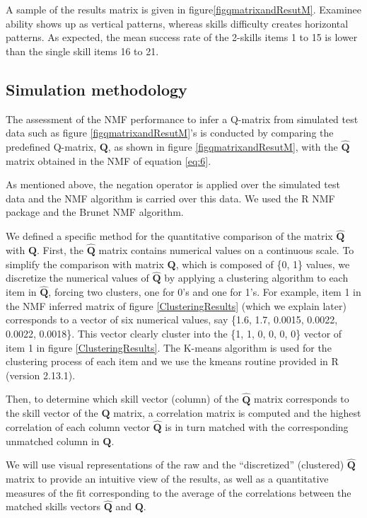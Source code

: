 A sample of the results matrix is given in figure\ref{figqmatrixandResutM}. Examinee ability shows up as vertical patterns, whereas skills difficulty creates horizontal patterns. As expected, the mean success rate of the 2-skills items 1 to 15 is lower than the single skill items 16 to 21.



\subsection{Simulation methodology}


The assessment of the NMF performance to infer a Q-matrix from simulated test data such as figure \ref{figqmatrixandResutM}'s is conducted by comparing the predefined Q-matrix, $\mathbf{Q}$, as shown in figure \ref{figqmatrixandResutM}, with the $\hat{\mathbf{Q}}$ matrix obtained in the NMF of equation \ref{eq:6}.

As mentioned above, the negation operator is applied over the simulated test data and the NMF algorithm is carried over this data. We used the R NMF package \citep{Gaujoux2010} and the Brunet NMF algorithm.

We defined a specific method for the quantitative comparison of the matrix $\hat{\mathbf{Q}}$ with $\mathbf{Q}$. First, the $\hat{\mathbf{Q}}$ matrix contains numerical values on a continuous scale. To simplify the comparison with matrix $\mathbf{Q}$, which is composed of \{0, 1\} values, we discretize the numerical values of $\hat{\mathbf{Q}}$ by applying a clustering algorithm to each item in $\hat{\mathbf{Q}}$, forcing two clusters, one for 0\textquoteright{}s and one for 1\textquoteright{}s. For example, item 1 in the NMF inferred matrix of figure \ref{ClusteringResults}  (which we explain later) corresponds to a vector of six numerical values, say \{1.6, 1.7, 0.0015, 0.0022, 0.0022, 0.0018\}. This vector clearly cluster into the \{1, 1, 0, 0, 0, 0\} vector of item 1 in figure \ref{ClusteringResults}. The K-means algorithm is used for the clustering process of each item and we use the kmeans routine provided in R (version 2.13.1).

Then, to determine which skill vector (column) of the $\hat{\mathbf{Q}}$ matrix corresponds to the skill vector of the $\mathbf{Q}$ matrix, a correlation matrix is computed and the highest correlation of each column vector $\hat{\mathbf{Q}}$ is in turn matched with the corresponding unmatched column in $\mathbf{Q}$.

We will use visual representations of the raw and the \textquotedblleft{}discretized\textquotedblright{} (clustered) $\hat{\mathbf{Q}}$ matrix to provide an intuitive view of the results, as well as a quantitative measures of the fit corresponding to the average of the correlations between the matched skills vectors $\hat{\mathbf{Q}}$ and $\mathbf{Q}$.


